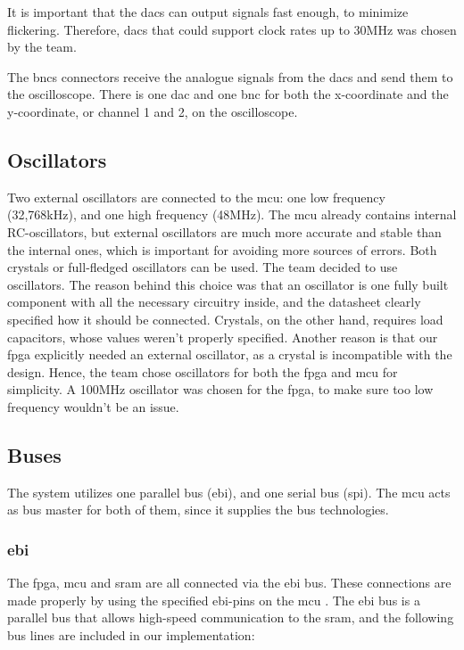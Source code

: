 It is important that the \gls{dac}s can output signals fast enough, to minimize flickering.
Therefore, \gls{dac}s that could support clock rates up to 30MHz was chosen by the team.

The \gls{bnc}s connectors receive the analogue signals from the \gls{dac}s and send them to the oscilloscope.
There is one \gls{dac} and one \gls{bnc} for both the x-coordinate and the y-coordinate, or channel 1 and 2, on the oscilloscope.

\subsection{Oscillators}
Two external oscillators are connected to the \gls{mcu}: one low frequency (32,768kHz), and one high frequency (48MHz).
The \gls{mcu} already contains internal RC-oscillators, but external oscillators are much more accurate and stable than the internal ones, which is important for avoiding more sources of errors.
Both crystals or full-fledged oscillators can be used. The team decided to use oscillators.
The reason behind this choice was that an oscillator is one fully built component with all the necessary circuitry inside, and the datasheet clearly specified how it should be connected.
Crystals, on the other hand, requires load capacitors, whose values weren't properly specified.
Another reason is that our \gls{fpga} explicitly needed an external oscillator, as a crystal is incompatible with the design.
Hence, the team chose oscillators for both the \gls{fpga} and \gls{mcu} for simplicity.
A 100MHz oscillator was chosen for the \gls{fpga}, to make sure too low frequency wouldn't be an issue.

\subsection{Buses}
The system utilizes one parallel bus (\gls{ebi}), and one serial bus (\gls{spi}).
The \gls{mcu} acts as bus master for both of them, since it supplies the bus technologies.

\subsubsection{\gls{ebi}}
The \gls{fpga}, \gls{mcu} and \gls{sram} are all connected via the \gls{ebi} bus.
These connections are made properly by using the specified \gls{ebi}-pins on the \gls{mcu} \cite[sec. 4.1]{efm32-datasheet}.
The \gls{ebi} bus is a parallel bus that allows high-speed communication to the \gls{sram}, and the following bus lines are included in our implementation:

